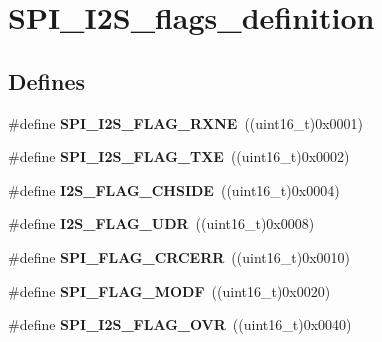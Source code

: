 \hypertarget{group__SPI__I2S__flags__definition}{
\section{SPI\_\-I2S\_\-flags\_\-definition}
\label{group__SPI__I2S__flags__definition}
}
\subsection*{Defines}
\begin{DoxyCompactItemize}
\item 
\hypertarget{group__SPI__I2S__flags__definition_ga79ee46c44f8886193293528460fea6ed}{
\#define {\bfseries SPI\_\-I2S\_\-FLAG\_\-RXNE}~((uint16\_\-t)0x0001)}
\label{group__SPI__I2S__flags__definition_ga79ee46c44f8886193293528460fea6ed}

\item 
\hypertarget{group__SPI__I2S__flags__definition_ga4dbac2dc3e0cfbd7a019ebecc45d66d7}{
\#define {\bfseries SPI\_\-I2S\_\-FLAG\_\-TXE}~((uint16\_\-t)0x0002)}
\label{group__SPI__I2S__flags__definition_ga4dbac2dc3e0cfbd7a019ebecc45d66d7}

\item 
\hypertarget{group__SPI__I2S__flags__definition_gaf0d629fd522a15aff188236d3254b2ad}{
\#define {\bfseries I2S\_\-FLAG\_\-CHSIDE}~((uint16\_\-t)0x0004)}
\label{group__SPI__I2S__flags__definition_gaf0d629fd522a15aff188236d3254b2ad}

\item 
\hypertarget{group__SPI__I2S__flags__definition_gaec08a8ad716bef1b87a8c8d992ab89ec}{
\#define {\bfseries I2S\_\-FLAG\_\-UDR}~((uint16\_\-t)0x0008)}
\label{group__SPI__I2S__flags__definition_gaec08a8ad716bef1b87a8c8d992ab89ec}

\item 
\hypertarget{group__SPI__I2S__flags__definition_ga30fb6af50e1f3c61cb9de76b0101c889}{
\#define {\bfseries SPI\_\-FLAG\_\-CRCERR}~((uint16\_\-t)0x0010)}
\label{group__SPI__I2S__flags__definition_ga30fb6af50e1f3c61cb9de76b0101c889}

\item 
\hypertarget{group__SPI__I2S__flags__definition_gac7d3525ab98cc18f02270a4dba685897}{
\#define {\bfseries SPI\_\-FLAG\_\-MODF}~((uint16\_\-t)0x0020)}
\label{group__SPI__I2S__flags__definition_gac7d3525ab98cc18f02270a4dba685897}

\item 
\hypertarget{group__SPI__I2S__flags__definition_ga42001f769835f133600a021a29764254}{
\#define {\bfseries SPI\_\-I2S\_\-FLAG\_\-OVR}~((uint16\_\-t)0x0040)}
\label{group__SPI__I2S__flags__definition_ga42001f769835f133600a021a29764254}


\end{DoxyCompactItemize}

